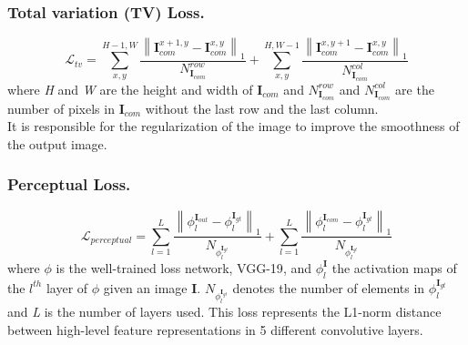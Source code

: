 \documentclass[10pt,twocolumn,letterpaper]{article}
\newcommand\norm[1]{\left\lVert#1\right\rVert}
\begin{document}
\subsubsection{Total variation (TV) Loss.}
\begin{dmath}
    \mathcal{L}_{tv} = \sum^{H-1,W}_{x,y} \frac{\norm{ \mathbf{I}^{x+1,y}_{com}
    - \mathbf{I}^{x,y}_{com} }_1}{N^{row}_{\mathbf{I}_{com}}} +
    \sum^{H,W-1}_{x,y} \frac{\norm{ \mathbf{I}^{x,y+1}_{com} -
    \mathbf{I}^{x,y}_{com} }_1}{N^{col}_{\mathbf{I}_{com}}}
\end{dmath}
where \textit{H} and \textit{W} are the height and width of $\mathbf{I}_{com}$
and $N^{row}_{\mathbf{I}_{com}}$ and $N^{col}_{\mathbf{I}_{com}}$ are the number
of pixels in $\mathbf{I}_{com}$ without the last row and the last column.
\\
It is responsible for the regularization of the image to improve the smoothness
of the output image.

\subsubsection{Perceptual Loss.}
\begin{dmath}
    \mathcal{L}_{perceptual} = \sum^L_{l=1} \frac{\norm{
      \phi^{\mathbf{I}_{out}}_l - \phi^{\mathbf{I}_{gt}}_l
    }_1}{N_{\phi^{\mathbf{I}_{gt}}_l}} + \sum^L_{l=1} \frac{\norm{
      \phi^{\mathbf{I}_{com}}_l - \phi^{\mathbf{I}_{gt}}_l
    }_1}{N_{\phi^{\mathbf{I}_{gt}}_l}}
\end{dmath}
where \(\phi\) is the well-trained loss network, VGG-19\cite{simonyan2014very},
and \(\phi^{\mathbf{I}}_l\) the activation maps of the \(l^{th}\) layer of
\(\phi\) given an image \(\mathbf{I}\).
\(N_{\phi^{\mathbf{I}_{gt}}_l}\) denotes the number of elements in
\(\phi^{\mathbf{I}_{gt}}_l\) and \textit{L} is the number of layers used.
This loss represents the L1-norm distance between high-level feature
representations in 5 different convolutive layers.
\end{document}
